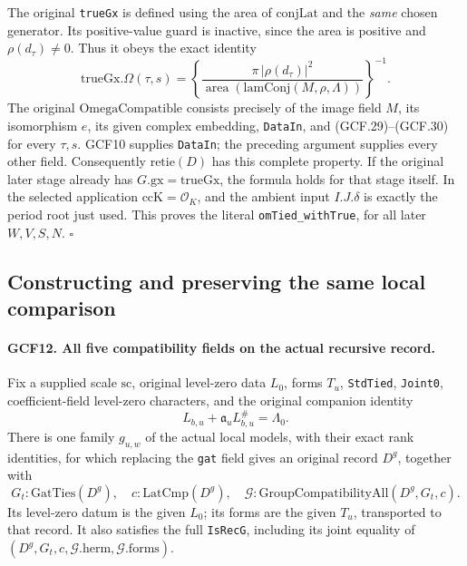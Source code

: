 \documentclass[11pt,a4paper]{article}
\numberwithin{equation}{section}
\theoremstyle{remark}\newtheorem{remark}[theorem]{Remark}
\begin{document}
The original \texttt{true\allowbreak Gx} is defined using the area of
\(\mathrm{conjLat}\) and the \emph{same} chosen generator.
Its positive-value guard is inactive, since the area is positive
and \(\rho(d_\tau)\ne0\).  Thus it obeys the exact identity
\[
 \mathrm{trueGx}.\Omega(\tau,s)
   =\left\{
       \frac{\pi\,|\rho(d_\tau)|^2}
       {\operatorname{area}(\mathrm{lamConj}(M,\rho,\Lambda))}
     \right\}^{-1}.                                  \tag{GCF.30}
\]
The original \(\mathrm{OmegaCompatible}\) consists precisely of
the image field \(M\), its isomorphism \(e\), its given complex
embedding, \texttt{Data\allowbreak In}, and (GCF.29)--(GCF.30) for every
\(\tau,s\).  GCF10 supplies \texttt{Data\allowbreak In}; the preceding argument
supplies every other field.  Consequently \(\mathrm{retie}(D)\)
has this complete property.  If the original later stage already has
\(G.\mathrm{gx}=\mathrm{trueGx}\), the formula holds for that
stage itself.  In the selected application \(\mathrm{ccK}=\mathcal
O_K\), and the ambient input \(I.J.\delta\) is exactly the period
root just used.  This proves the literal
\texttt{om\allowbreak Tied\_\allowbreak with\allowbreak True}, for all later \(W,V,S,N\).
\hfill\(\square\)

\subsection{Constructing and preserving the same local comparison}

\paragraph{GCF12. All five compatibility fields on the actual recursive record.}
\label{claim:GCF12}
Fix a supplied scale \(\mathrm{sc}\), original level-zero data
\(L_0\), forms \(T_u\), \texttt{Std\allowbreak Tied}, \texttt{Joint0},
coefficient-field level-zero characters, and the original companion
identity
\[
              L_{b,u}+\mathfrak a_u L_{b,u}^{\#}=\Lambda_0.
 \tag{GCF.31}
\]
There is one family \(g_{u,w}\) of the actual local models, with
their exact rank identities, for which replacing the \texttt{gat}
field gives an original record \(D^g\), together with
\[
 G_t:\mathrm{GatTies}(D^g),\quad c:\mathrm{LatCmp}(D^g),\quad
 \mathcal G:\mathrm{GroupCompatibilityAll}(D^g,G_t,c).
 \tag{GCF.32}
\]
Its level-zero datum is the given \(L_0\); its forms are the given
\(T_u\), transported to that record.  It also satisfies the full
\texttt{Is\allowbreak Rec\allowbreak G}, including its joint equality of
\((D^g,G_t,c,\mathcal G.\mathrm{herm},\mathcal G.\mathrm{forms})\).
\end{document}
